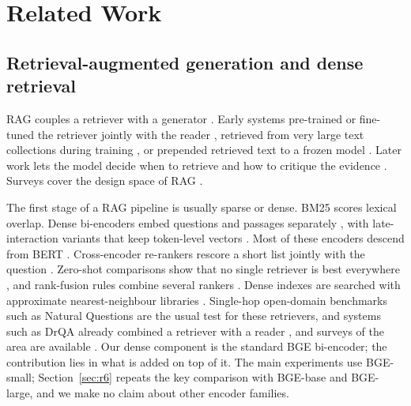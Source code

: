 \documentclass[a4paper,fleqn]{cas-sc}
\begin{document}
\section{Related Work}\label{sec:related}
\subsection{Retrieval-augmented generation and dense retrieval}
RAG couples a retriever with a generator \citep{lewis2020rag}. Early systems pre-trained or fine-tuned the retriever jointly with the reader \citep{guu2020realm,izacard2021fid,izacard2023atlas}, retrieved from very large text collections during training \citep{borgeaud2022retro}, or prepended retrieved text to a frozen model \citep{ram2023incontext,shi2024replug}. Later work lets the model decide when to retrieve and how to critique the evidence \citep{asai2024selfrag,jiang2023flare}. Surveys cover the design space of RAG \citep{gao2023ragsurvey,fan2024ragmeetingllms,wang2024bestpractices}.

The first stage of a RAG pipeline is usually sparse or dense. BM25 \citep{robertson2009bm25} scores lexical overlap. Dense bi-encoders embed questions and passages separately \citep{karpukhin2020dpr,reimers2019sbert,xiong2021ance,izacard2022contriever,wang2022e5,xiao2023bge}, with late-interaction variants that keep token-level vectors \citep{khattab2020colbert}. Most of these encoders descend from BERT \citep{devlin2019bert}. Cross-encoder re-rankers rescore a short list jointly with the question \citep{nogueira2019rerank}. Zero-shot comparisons show that no single retriever is best everywhere \citep{thakur2021beir}, and rank-fusion rules combine several rankers \citep{cormack2009rrf}. Dense indexes are searched with approximate nearest-neighbour libraries \citep{johnson2021faiss}. Single-hop open-domain benchmarks such as Natural Questions \citep{kwiatkowski2019nq} are the usual test for these retrievers, and systems such as DrQA already combined a retriever with a reader \citep{chen2017drqa}, and surveys of the area are available \citep{zhu2021retrieving}. Our dense component is the standard BGE bi-encoder; the contribution lies in what is added on top of it. The main experiments use BGE-small; Section~\ref{sec:r6} repeats the key comparison with BGE-base and BGE-large, and we make no claim about other encoder families.
\end{document}
